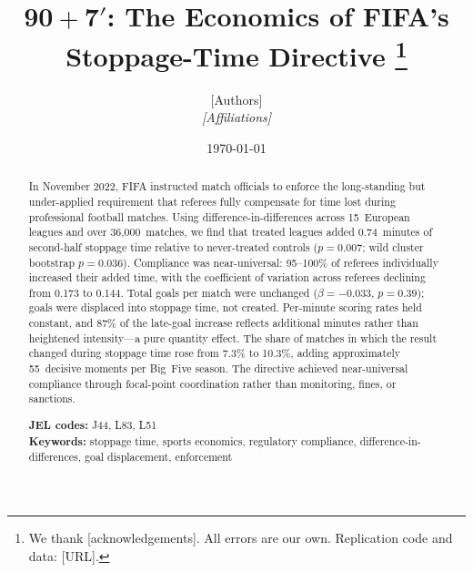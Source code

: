 \documentclass[12pt]{article}
\title{\textbf{$\boldsymbol{90+7'}$: The Economics of FIFA's
Stoppage-Time Directive}%
\thanks{We thank [acknowledgements]. All errors are our own.
Replication code and data: [URL].}}
\author{[Authors]\\[4pt]\textit{[Affiliations]}}
\date{\today}
\begin{document}
\maketitle


\begin{abstract}
\noindent
In November 2022, FIFA instructed match officials to enforce the
long-standing but under-applied requirement that referees fully
compensate for time lost during professional football matches. Using
difference-in-differences across 15~European leagues and over
36,000~matches, we find that treated leagues added 0.74~minutes of
second-half stoppage time relative to never-treated controls ($p =
0.007$; wild cluster bootstrap $p = 0.036$). Compliance was
near-universal: 95--100\% of referees individually increased their
added time, with the coefficient of variation across referees
declining from 0.173 to 0.144. Total goals per match were
unchanged ($\beta = -0.033$, $p = 0.39$); goals were displaced
into stoppage time, not created. Per-minute scoring rates held
constant, and 87\% of the late-goal increase reflects additional
minutes rather than heightened intensity---a pure quantity effect.
The share of matches in which the result changed during stoppage
time rose from 7.3\% to 10.3\%, adding approximately 55~decisive
moments per Big~Five season. The directive achieved near-universal
compliance through focal-point coordination rather than monitoring,
fines, or sanctions.

\medskip
\noindent
\textbf{JEL codes:} J44, L83, L51 \\
\textbf{Keywords:} stoppage time, sports economics, regulatory
compliance, difference-in-differences, goal displacement,
enforcement
\end{abstract}

\newpage






\end{document}
